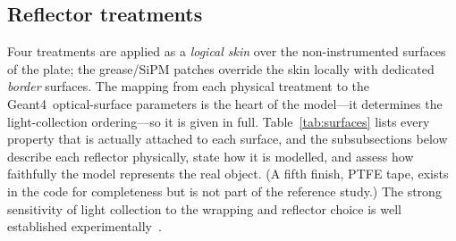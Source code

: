 \documentclass[11pt,a4paper]{article}
\newcommand{\gfour}{Geant4}
\begin{document}
\subsection{Reflector treatments}
\label{sec:reflectors}

Four treatments are applied as a \emph{logical skin} over the non-instrumented
surfaces of the plate; the grease/SiPM patches override the skin locally with
dedicated \emph{border} surfaces. The mapping from each physical treatment to the
\gfour\ optical-surface parameters is the heart of the model---it determines
the light-collection ordering---so it is given in full. Table~\ref{tab:surfaces}
lists every property that is actually attached to each surface, and the
subsubsections below describe each reflector physically, state how it is
modelled, and assess how faithfully the model represents the real object. (A
fifth finish, PTFE tape, exists in the code for completeness but is not part of
the reference study.) The strong sensitivity of light collection to the wrapping
and reflector choice is well established
experimentally~\cite{Taheri2017}.
\end{document}
